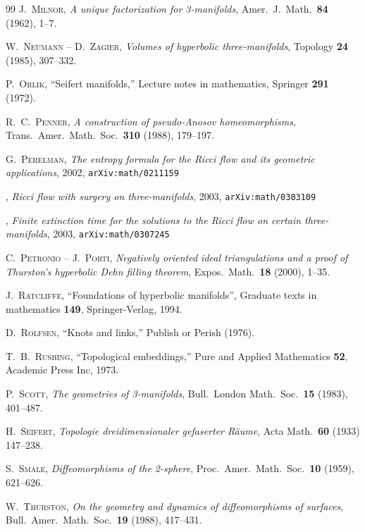 \begin{thebibliography}{99}
 \textsc{J.~Milnor}, \emph{A unique factorization for 3-manifolds}, Amer.~J.~Math.~\textbf{84} (1962), 1--7.

 \textsc{W.~Neumann -- D.~Zagier}, \emph{Volumes of hyperbolic three-manifolds}, Topology \textbf{24} (1985), 307--332.

 \textsc{P.~Orlik}, ``Seifert manifolds,'' Lecture notes in mathematics, Springer \textbf{291} (1972). 

 \textsc{R.~C.~Penner}, \emph{A construction of pseudo-Anosov homeomorphisms}, Trans.~Amer.~Math.~Soc.~\textbf{310} (1988), 179--197.

 \textsc{G.~Perelman}, \emph{The entropy formula for the Ricci flow and its geometric applications}, 2002, {\tt arXiv:math/0211159}

 \bysame, \emph{Ricci flow with surgery on three-manifolds}, 2003, {\tt arXiv:math/0303109}

 \bysame, \emph{Finite extinction time for the solutions to the Ricci flow on certain three-manifolds}, 2003, {\tt arXiv:math/0307245}

 \textsc{C.~Petronio -- J.~Porti}, \emph{Negatively oriented ideal triangulations and a proof of Thurston's hyperbolic Dehn filling theorem}, 
Expos.~Math.~\textbf{18} (2000), 1--35.

 \textsc{J.~Ratcliffe}, ``Foundations of hyperbolic manifolds'', Graduate texts in mathematics \textbf{149}, Springer-Verlag, 1994.

 \textsc{D.~Rolfsen}, ``Knots and links,'' Publish or Perish (1976).

 \textsc{T.~B.~Rushing}, ``Topological embeddings,'' Pure and Applied Mathematics \textbf{52}, Academic Press Inc, 1973. 

 \textsc{P.~Scott}, \emph{The geometries of 3-manifolds}, Bull.~London Math.~Soc.~\textbf{15} (1983), 401--487.

 \textsc{H.~Seifert}, \emph{Topologie dreidimensionaler gefaserter R\"aume}, Acta Math.~\textbf{60} (1933) 147--238.

 \textsc{S.~Smale}, \emph{Diffeomorphisms of the 2-sphere}, Proc.~Amer.~Math.~Soc.~\textbf{10} (1959), 621--626.

 \textsc{W.~Thurston}, \emph{On the geometry and dynamics of diffeomorphisms of surfaces}, Bull.~Amer.~Math.~Soc.~\textbf{19} (1988), 417--431.


\end{thebibliography}
